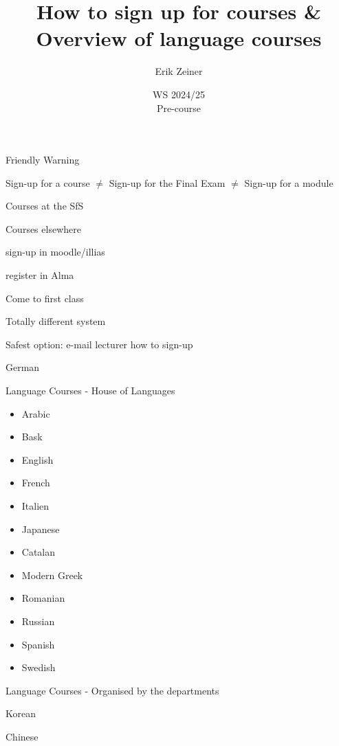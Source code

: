 \documentclass[aspectratio=169,hyperref={unicode}]{beamer}
\title{How to sign up for courses \& Overview of language courses}
\author{Erik Zeiner}
\institute{Fachschaft General \& Computational Linguistics\\ \textbf{University of Tübingen}}
\date{WS 2024/25 \\ Pre-course}
\begin{document}
\frame{\titlepage}



\begin{frame}{Friendly Warning}

Sign-up for a course $\neq$ Sign-up for the Final Exam $\neq$ Sign-up for a module
\end{frame}


\begin{frame}{Courses at the SfS}
\end{frame}

\begin{frame}{Courses elsewhere}



sign-up in moodle/illias

register in Alma

Come to first class

Totally different system

Safest option: e-mail lecturer how to sign-up
\end{frame}


\begin{frame}{German}
\end{frame}

\begin{frame}{Language Courses - House of Languages}
\begin{itemize}
\item Arabic
\item Bask
\item English
\item French
\item Italien
\item Japanese
\item Catalan
\item Modern Greek
\item Romanian
\item Russian
\item Spanish
\item Swedish
\end{itemize}
\end{frame}

\begin{frame}{Language Courses - Organised by the departments}

\begin{block}{Korean}
\end{block}	

\begin{block}{Chinese}
\end{block}	

\end{frame}
\end{document}
